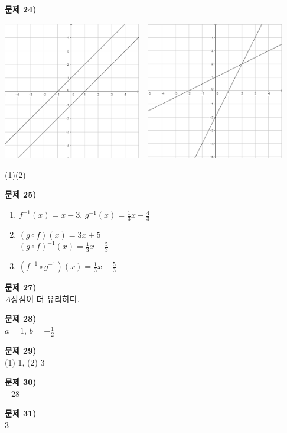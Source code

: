 \documentclass{oblivoir}
\newcounter{num}
\newcommand\an[1]{\par\bigskip\noindent\textbf{문제 #1)}\\}
\begin{document}
\begin{minipage}{0.49\textwidth}
%
\an{24}
\begin{center}
\includegraphics[width=0.45\textwidth]{y=x+1}
~
\includegraphics[width=0.45\textwidth]{y=2x-2}
\par\noindent(1)\qquad\qquad\qquad\quad\:\:(2)
\end{center}

%
\an{25}
\begin{enumerate}[topsep=0pt]
\item
\(f^{-1}(x)=x-3\), \(g^{-1}(x)=\frac13x+\frac43\)
\item
\((g\circ f)(x)=3x+5\)\\
\((g\circ f)^{-1}(x)=\frac13x-\frac53\)
\item
\((f^{-1}\circ g^{-1})(x)=\frac13x-\frac53\)
\end{enumerate}
%
\an{27}
\(A\)상점이 더 유리하다.

%
\an{28}
\(a=1\), \(b=-\frac12\)

%
\an{29}
(1) 1, (2) 3

%
\an{30}
\(-28\)

%
\an{31}
\(3\)
\end{minipage}
\end{document}
